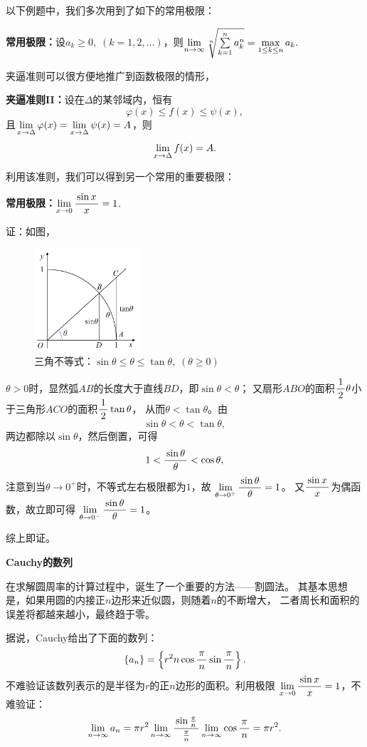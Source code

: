 以下例题中，我们多次用到了如下的常用极限：
\begin{thx}
  {\bf 常用极限：}设$a_k\geq0,\;(k=1,2,\ldots)$，则$\lim\limits_{n\to\infty}\sqrt[n]
  {\sum\limits_{k=1}^na_k^n}=\max\limits_{1\leq k\leq n}a_k.$
\end{thx}

\bs
夹逼准则可以很方便地推广到函数极限的情形，
\begin{thx}
	{\bf 夹逼准则II：}设在$\Delta$的某邻域内，恒有
	$$\varphi(x)\leq f(x)\leq\psi(x), $$
	且$\lim\limits_{x\to{\Delta}}\varphi(x)=\lim\limits_{x\to{\Delta}}\psi(x)=A$，则
	$$\lim\limits_{x\to{\Delta}}f(x)=A.$$
\end{thx}

利用该准则，我们可以得到另一个常用的重要极限：
\begin{thx}
	{\bf 常用极限：}$\lim\limits_{x\to{0}}\displaystyle\frac{\,{\sin x}\,}{\,{x}\,}=1$.
\end{thx}

证：如图，
	
\begin{figure}[h]
	\centering
	\includegraphics[width=0.35\textwidth]{./Images/Ch01/xsintan.pdf}
	\caption{三角不等式：$\sin\theta\leq\theta\leq\tan\theta,
	\;(\theta\geq0)$}
	\label{fig:xsintan}
\end{figure}
$\theta>0$时，显然弧$AB$的长度大于直线$BD$，即$\sin\theta<\theta$；
又扇形$ABO$的面积$\displaystyle\frac{\,{1}\,}{\,{2}\,}\theta$小于三角形$ACO$的面积$\displaystyle\frac{\,{1}\,}{\,{2}\,}\tan\theta$，
从而$\theta<\tan\theta$。由
$$\sin\theta<\theta<\tan\theta,$$
两边都除以$\sin\theta$，然后倒置，可得
$$1<\displaystyle\frac{\,{\sin\theta}\,}{\,{\theta}\,}<\cos\theta,$$
注意到当$\theta\to 0^+$时，不等式左右极限都为$1$，故
$\lim\limits_{\theta\to0^+}\displaystyle\frac{\,{\sin\theta}\,}{\,{\theta}\,}=1$。
又$\displaystyle\frac{\,{\sin x}\,}{\,{x}\,}$为偶函数，故立即可得
$\lim\limits_{\theta\to0^-}\displaystyle\frac{\,{\sin\theta}\,}{\,{\theta}\,}=1$。

综上即证。\fin

\begin{shaded}
	{\bf Cauchy的数列}

	在求解圆周率的计算过程中，诞生了一个重要的方法——割圆法。
	其基本思想是，如果用圆的内接正$n$边形来近似圆，则随着$n$的不断增大，
	二者周长和面积的误差将都越来越小，最终趋于零。

	据说，Cauchy给出了下面的数列：
	$$\{a_n\}=\left\{r^2n\cos\displaystyle\frac{\,{\pi}\,}{\,{n}\,}\sin\displaystyle\frac{\,{\pi}\,}{\,{n}\,}\right\}.$$
	不难验证该数列表示的是半径为$r$的正$n$边形的面积。利用极限
	$\lim\limits_{x\to{0}}\displaystyle\frac{\,{\sin x}\,}{\,{x}\,}=1$，不难验证：
	$$\lim\limits_{n\to\infty} a_n=\pi r^2\lim\limits_{n\to\infty}\displaystyle\frac{\,{\sin\frac{\pi}n}\,}{\,{\frac{\pi}n}\,}\lim\limits_{n\to\infty}\cos\displaystyle\frac{\,{\pi}\,}{\,{n}\,}=\pi r^2.$$
\end{shaded}

